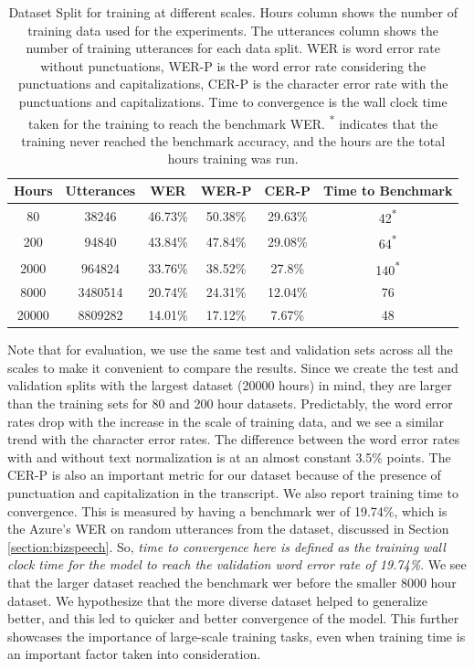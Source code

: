 \begin{table}[ht]
\centering
\begin{tabular}{c c c c c c}
\hline
  Hours & Utterances & WER & WER-P & CER-P & Time to Benchmark\\
 \hline
  80 & 38246 & 46.73\% & 50.38\% & 29.63\% & 42\textsuperscript{*}\\ 
  200 & 94840 & 43.84\% & 47.84\% & 29.08\% & 64\textsuperscript{*}\\
  2000 & 964824 & 33.76\% & 38.52\% & 27.8\% & 140\textsuperscript{*}\\
  8000 & 3480514 & 20.74\% & 24.31\% & 12.04\% & 76\\
  20000 & 8809282 & 14.01\% & 17.12\% & 7.67\% & 48\\
 \hline
\end{tabular}
\caption{\label{table:datascales}Dataset Split for training at different scales. Hours column shows the number of training data used for the experiments. The utterances column shows the number of training utterances for each data split. WER is word error rate without punctuations, WER-P is the word error rate considering the punctuations and capitalizations, CER-P is the character error rate with the punctuations and capitalizations. Time to convergence is the wall clock time taken for the training to reach the benchmark WER. \textsuperscript{*} indicates that the training never reached the benchmark accuracy, and the hours are the total hours training was run.}
\end{table}

Note that for evaluation, we use the same test and validation sets across all the scales to make it convenient to compare the results. Since we create the test and validation splits with the largest dataset (20000 hours) in mind, they are larger than the training sets for 80 and 200 hour datasets. Predictably, the word error rates drop with the increase in the scale of training data, and we see a similar trend with the character error rates. The difference between the word error rates with and without text normalization is at an almost constant 3.5\% points. The CER-P is also an important metric for our dataset because of the presence of punctuation and capitalization in the transcript. We also report training time to convergence. This is measured by having a benchmark \acrshort{wer} of 19.74\%, which is the Azure's WER on random utterances from the dataset, discussed in Section \ref{section:bizspeech}. So, \emph{time to convergence here is defined as the training wall clock time for the model to reach the validation word error rate of 19.74\%}. We see that the larger dataset reached the benchmark \acrshort{wer} before the smaller 8000 hour dataset. We hypothesize that the more diverse dataset helped to generalize better, and this led to quicker and better convergence of the model. This further showcases the importance of large-scale training tasks, even when training time is an important factor taken into consideration.

